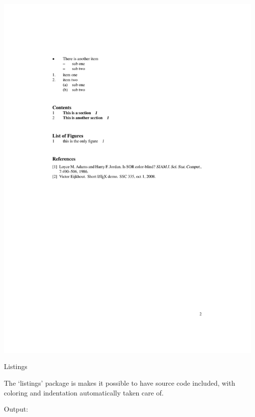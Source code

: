 \includegraphics[scale=.75]{code/latexdemo/demopage2}

 {Listings}

The `listings' package is makes it possible to have source code included,
with coloring and indentation automatically taken care of.

\begin{multicols}{2}
\tiny
{}
\end{multicols}

Output:

